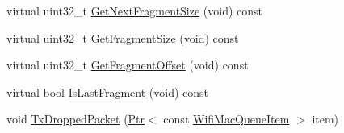 \begin{DoxyCompactItemize}
\item 
virtual uint32\+\_\+t \hyperlink{classns3_1_1DcaTxop_a2e785096e541316ddf8cab4852a5e950}{Get\+Next\+Fragment\+Size} (void) const 
\item 
virtual uint32\+\_\+t \hyperlink{classns3_1_1DcaTxop_a9f06adfbc1bcec831b1bcd2d70a5e1be}{Get\+Fragment\+Size} (void) const 
\item 
virtual uint32\+\_\+t \hyperlink{classns3_1_1DcaTxop_a75f82c1a790623d85d950f873103bc31}{Get\+Fragment\+Offset} (void) const 
\item 
virtual bool \hyperlink{classns3_1_1DcaTxop_a85e61c81197f366aaafe5b2f554f3ed9}{Is\+Last\+Fragment} (void) const 
\item 
void \hyperlink{classns3_1_1DcaTxop_a4f457d153e36b936247806b1c2a5c155}{Tx\+Dropped\+Packet} (\hyperlink{classns3_1_1Ptr}{Ptr}$<$ const \hyperlink{classns3_1_1WifiMacQueueItem}{Wifi\+Mac\+Queue\+Item} $>$ item)
\end{DoxyCompactItemize}
